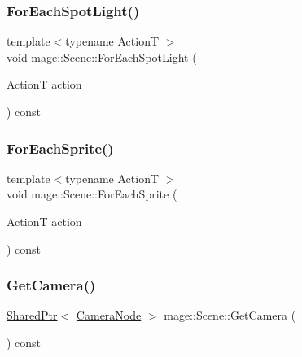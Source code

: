 \hypertarget{classmage_1_1_scene_a51bb697a9d96891bb7502317efff7ec1}{}\label{classmage_1_1_scene_a51bb697a9d96891bb7502317efff7ec1} 
\subsubsection{\texorpdfstring{For\+Each\+Spot\+Light()}{ForEachSpotLight()}}
{\footnotesize\ttfamily template$<$typename ActionT $>$ \\
void mage\+::\+Scene\+::\+For\+Each\+Spot\+Light (\begin{DoxyParamCaption}\item[{ActionT}]{action }\end{DoxyParamCaption}) const\hspace{0.3cm}{\ttfamily [private]}}

\hypertarget{classmage_1_1_scene_ae181b160f9a75593db9f551c9c233329}{}\label{classmage_1_1_scene_ae181b160f9a75593db9f551c9c233329} 
\subsubsection{\texorpdfstring{For\+Each\+Sprite()}{ForEachSprite()}}
{\footnotesize\ttfamily template$<$typename ActionT $>$ \\
void mage\+::\+Scene\+::\+For\+Each\+Sprite (\begin{DoxyParamCaption}\item[{ActionT}]{action }\end{DoxyParamCaption}) const}

\hypertarget{classmage_1_1_scene_ad77fe833ca79bf862e1929dfdeb0f1fd}{}\label{classmage_1_1_scene_ad77fe833ca79bf862e1929dfdeb0f1fd} 
\subsubsection{\texorpdfstring{Get\+Camera()}{GetCamera()}}
{\footnotesize\ttfamily \hyperlink{namespacemage_a1e01ae66713838a7a67d30e44c67703e}{Shared\+Ptr}$<$ \hyperlink{classmage_1_1_camera_node}{Camera\+Node} $>$ mage\+::\+Scene\+::\+Get\+Camera (\begin{DoxyParamCaption}{ }\end{DoxyParamCaption}) const\hspace{0.3cm}{\ttfamily [noexcept]}}

